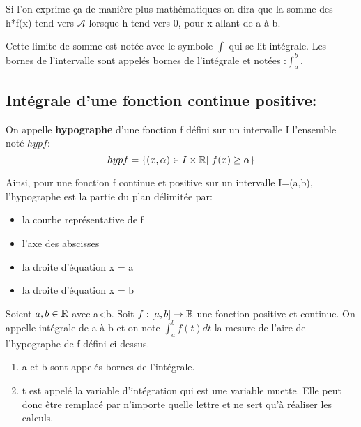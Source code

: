 Si l'on exprime ça de manière \og plus mathématiques\fg{} on dira que
la somme des h*f(x) tend vers $\mathcal{A}$ lorsque h tend vers 0,
pour x allant de a à b.

Cette limite de somme est notée avec le symbole $\int$ qui se lit
intégrale. Les bornes de l'intervalle sont appelés bornes de
l'intégrale et notées :$\int_a^b$.

\subsection{Intégrale d'une fonction continue positive: }
\begin{mydef}
  On appelle \textbf{hypographe} d'une fonction f défini sur un
  intervalle I l'ensemble noté $hyp f$:
  \[
    hyp f = \{ (x,\alpha) \in I \times \mathbb{R} | ~f(x) \geq \alpha \}
  \]
\end{mydef}

Ainsi, pour une fonction f continue et positive sur un intervalle I=(a,b),
l'hypographe est la partie du plan délimitée par:
\begin{itemize}
\item la courbe représentative de f
\item l'axe des abscisses
\item la droite d'équation x = a
\item la droite d'équation x = b
\end{itemize}

\begin{mydef}
  Soient $a,b \in \mathbb{R}$ avec a<b. Soit $f:[a,b] \to \mathbb{R}$  une fonction
  positive et continue. On appelle intégrale de a à b et on note
  $\int_a^b f(t) dt$ la mesure de l'aire de l'hypographe de f défini
  ci-dessus. 
\end{mydef} 

\begin{Rem}
  \begin{enumerate}[label = (\alph*), leftmargin=2cm]
  \item a et b sont appelés bornes de l'intégrale.
  \item t est appelé la variable d'intégration qui est une variable
    muette. Elle peut donc être remplacé par n'importe quelle lettre
    et ne sert qu'à réaliser les calculs.
  \end{enumerate}
\end{Rem}


